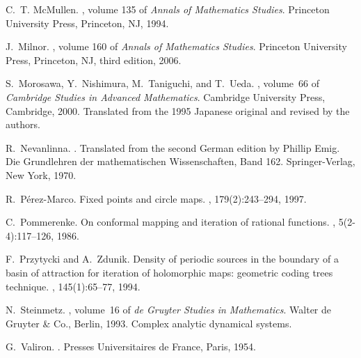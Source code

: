 \documentclass[a4paper,12pt]{amsart}
\theoremstyle{plain}
\theoremstyle{definition}
\theoremstyle{remark}
\numberwithin{equation}{section}
\begin{document}
\begin{thebibliography}{10}
C.~T. McMullen.
, volume 135 of {\em Annals
  of Mathematics Studies}.
\newblock Princeton University Press, Princeton, NJ, 1994.

J.~Milnor.
, volume 160 of {\em Annals of
  Mathematics Studies}.
\newblock Princeton University Press, Princeton, NJ, third edition, 2006.

S.~Morosawa, Y.~Nishimura, M.~Taniguchi, and T.~Ueda.
, volume~66 of {\em Cambridge Studies in
  Advanced Mathematics}.
\newblock Cambridge University Press, Cambridge, 2000.
\newblock Translated from the 1995 Japanese original and revised by the
  authors.

R.~Nevanlinna.
.
\newblock Translated from the second German edition by Phillip Emig. Die
  Grundlehren der mathematischen Wissenschaften, Band 162. Springer-Verlag, New
  York, 1970.

R.~P{\'e}rez-Marco.
\newblock Fixed points and circle maps.
, 179(2):243--294, 1997.

C.~Pommerenke.
\newblock On conformal mapping and iteration of rational functions.
, 5(2-4):117--126, 1986.

F.~Przytycki and A.~Zdunik.
\newblock Density of periodic sources in the boundary of a basin of attraction
  for iteration of holomorphic maps: geometric coding trees technique.
, 145(1):65--77, 1994.

N.~Steinmetz.
, volume~16 of {\em de Gruyter Studies in
  Mathematics}.
\newblock Walter de Gruyter \& Co., Berlin, 1993.
\newblock Complex analytic dynamical systems.

G.~Valiron.
.
\newblock Presses Universitaires de France, Paris, 1954.

\end{thebibliography}
\end{document}
